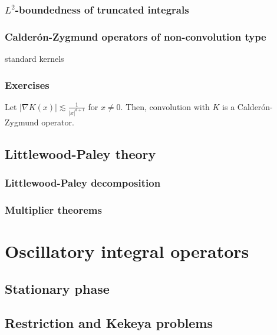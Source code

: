 \documentclass{../../large}
\begin{document}
\section{$L^2$-boundedness of truncated integrals}

\section{Calder\'on-Zygmund operators of non-convolution type}
standard kernels



\section*{Exercises}
\begin{prb}
Let $|\nabla K(x)|\lesssim\frac1{|x|^{d+1}}$ for $x\ne0$.
Then, convolution with $K$ is a Calder\'on-Zygmund operator.
\end{prb}




\chapter{Littlewood-Paley theory}
\section{Littlewood-Paley decomposition}
\section{Multiplier theorems}

\chapter{}


\part{Oscillatory integral operators}

\chapter{Stationary phase}

\chapter{Restriction and Kekeya problems}
\end{document}
